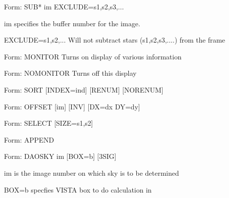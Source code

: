 {\newpage\clearpage
{}%
\begin{command}
  \item[Form: SUB* im EXCLUDE=s1,s2,s3,...\hfill]{}
  \item[im]{specifies the buffer number for the image.}
  \item[EXCLUDE=s1,s2,... ]{  Will not subtract stars (s1,s2,s3,....) from
    the frame}
\end{command}%
\lthtmlfigureZ
\lthtmlcheckvsize\clearpage}

{\newpage\clearpage
{}%
\begin{example}
  \item[Form: MONITOR\hfill]{Turns on display of various information}
  \item[Form: NOMONITOR\hfill]{Turns off this display}
\end{example}%
\lthtmlfigureZ
\lthtmlcheckvsize\clearpage}

{\newpage\clearpage
{}%
\begin{command}
  \item[Form: SORT {[INDEX=ind]} {[RENUM]} {[NORENUM]}\hfill]{}
\end{command}%
\lthtmlfigureZ
\lthtmlcheckvsize\clearpage}

{\newpage\clearpage
{}%
\begin{command}
  \item[Form: OFFSET {[im]} {[INV]} {[DX=dx DY=dy]}\hfill]{}
\end{command}%
\lthtmlfigureZ
\lthtmlcheckvsize\clearpage}

{\newpage\clearpage
{}%
\begin{command}
  \item[Form: SELECT {[SIZE=s1,s2]}\hfill]{}
\end{command}%
\lthtmlfigureZ
\lthtmlcheckvsize\clearpage}

{\newpage\clearpage
{}%
\begin{command}
  \item[Form: APPEND\hfill]{}
\end{command}%
\lthtmlfigureZ
\lthtmlcheckvsize\clearpage}

{\newpage\clearpage
{}%
\begin{command}
  \item[Form: DAOSKY im {[BOX=b]} {[3SIG]}\hfill]{}
  \item[im]{is the image number on which sky is to be determined}
  \item[BOX=b]{specfies VISTA box to do calculation in}
\end{command}%
\lthtmlfigureZ
\lthtmlcheckvsize\clearpage}

